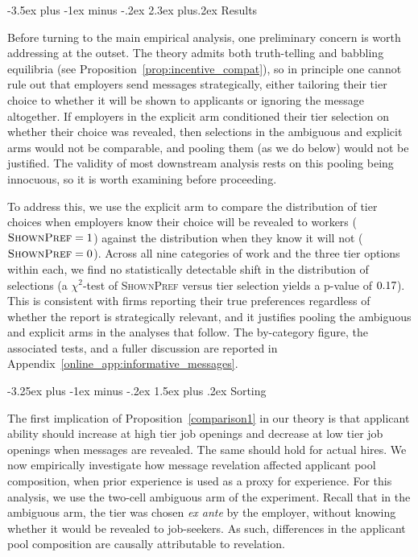\documentclass[12pt]{article}
\makeatletter
\renewcommand{\section}{%
  \@startsection{section}{1}{\z@}%
  {-3.5ex plus -1ex minus -.2ex}%
  {2.3ex plus.2ex}%
  {\normalfont\Large\bfseries}%
}
\renewcommand{\subsection}{%
  \@startsection{subsection}{2}{\z@}%
  {-3.25ex plus -1ex minus -.2ex}%
  {1.5ex plus .2ex}%
  {\normalfont\large\bfseries}%
}
\makeatother
\begin{document}
\section{Results} \label{sec:results}

Before turning to the main empirical analysis, one preliminary concern is worth addressing at the outset. The theory admits both truth-telling and babbling equilibria (see Proposition~\ref{prop:incentive_compat}), so in principle one cannot rule out that employers send messages strategically, either tailoring their tier choice to whether it will be shown to applicants or ignoring the message altogether. If employers in the explicit arm conditioned their tier selection on whether their choice was revealed, then selections in the ambiguous and explicit arms would not be comparable, and pooling them (as we do below) would not be justified. The validity of most downstream analysis rests on this pooling being innocuous, so it is worth examining before proceeding.

To address this, we use the explicit arm to compare the distribution of tier choices when employers know their choice will be revealed to workers ($\textsc{ShownPref}=1$) against the distribution when they know it will not ($\textsc{ShownPref}=0$). Across all nine categories of work and the three tier options within each, we find no statistically detectable shift in the distribution of selections (a $\chi^2$-test of \textsc{ShownPref} versus tier selection yields a p-value of $0.17{}$). This is consistent with firms reporting their true preferences regardless of whether the report is strategically relevant, and it justifies pooling the ambiguous and explicit arms in the analyses that follow. The by-category figure, the associated tests, and a fuller discussion are reported in Appendix~\ref{online_app:informative_messages}.

\subsection{Sorting} \label{sec:results_sorting} %

The first implication of Proposition~\ref{comparison1} in our theory is that applicant ability should increase at high tier job openings and decrease at low tier job openings when messages are revealed. The same should hold for actual hires. We now empirically investigate how message revelation affected applicant pool composition, when prior experience is used as a proxy for experience.
For this analysis, we use the two-cell ambiguous arm of the experiment.
Recall that in the ambiguous arm, the tier was chosen \emph{ex ante} by the employer, without knowing whether it would be revealed to job-seekers.
As such, differences in the applicant pool composition are causally attributable to revelation.
\end{document}
